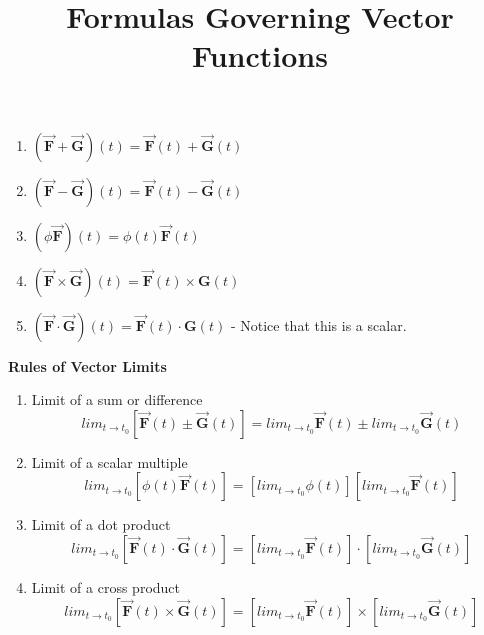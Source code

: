 \documentclass[12pt,a4paper]{amsart}
\numberwithin{equation}{section}
\theoremstyle{plain}
\theoremstyle{definition}
\begin{document}
\title{Formulas Governing Vector Functions }



\maketitle

\begin{enumerate}
	\item $(\vec{\mathbf{F}}+\vec{\mathbf{G}})(t) = \vec{\mathbf{F}}(t) + \vec{\mathbf{G}}(t)  $
	\item $(\vec{\mathbf{F}}-\vec{\mathbf{G}})(t) = \vec{\mathbf{F}}(t) - \vec{\mathbf{G}}(t)  $
	\item $(\phi\vec{\mathbf{F}})(t) = \phi(t) \vec{\mathbf{F}}(t)  $
	\item $(\vec{\mathbf{F}}\times\vec{\mathbf{G}})(t) = \vec{\mathbf{F}}(t) \times{\mathbf{G}}(t)  $
	\item $(\vec{\mathbf{F}}\cdot\vec{\mathbf{G}})(t) = \vec{\mathbf{F}}(t) \cdot{\mathbf{G}}(t)  $ - Notice that this is a scalar.
\end{enumerate}

\hspace{0.6in}

\textbf{Rules of Vector Limits}
\begin{enumerate}
	\item Limit of a sum or difference $$lim_{t\to t_0}\left[\vec{\mathbf{F}}(t) \pm \vec{\mathbf{G}}(t)\right] = lim_{t\to t_0}\vec{\mathbf{F}}(t) \pm lim_{t\to t_0}\vec{\mathbf{G}}(t) $$
	
	\item Limit of a scalar multiple $$lim_{t\to t_0}\left[ \phi(t) \vec{\mathbf{F}}(t)\right] = \left[lim_{t\to t_0} \phi(t)\right]  \left[lim_{t\to t_0}\vec{\mathbf{F}}(t)\right] $$
	
	\item Limit of a dot product $$lim_{t\to t_0}\left[ \vec{\mathbf{F}}(t)\cdot \vec{\mathbf{G}}(t)\right] = \left[lim_{t\to t_0}\vec{\mathbf{F}}(t)\right] \cdot \left[lim_{t\to t_0}\vec{\mathbf{G}}(t)\right] $$
	
	\item Limit of a cross product $$lim_{t\to t_0}\left[ \vec{\mathbf{F}}(t)\times \vec{\mathbf{G}}(t)\right] = \left[lim_{t\to t_0}\vec{\mathbf{F}}(t)\right] \times \left[lim_{t\to t_0}\vec{\mathbf{G}}(t)\right] $$
\end{enumerate}
\end{document}

